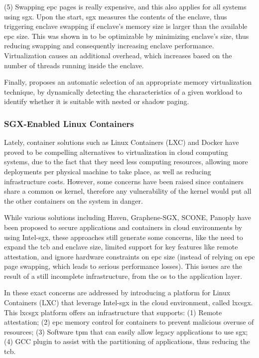 (5) Swapping \gls{epc} pages is really expensive, and this also applies for all systems using \gls{sgx}. 
Upon the start, \gls{sgx} measures the contents of the enclave, thus triggering enclave swapping if enclave's memory size is larger than the available \gls{epc} size. 
This was shown in \cite{sgxVirtualizationPaper} to be optimizable by minimizing enclave's size, thus reducing swapping and consequently increasing enclave performance.
Virtualization causes an additional overhead, which increases based on the number of threads running inside the enclave.

Finally, \cite{sgxVirtualizationPaper} proposes an automatic selection of an appropriate memory virtualization technique, by dynamically detecting the characteristics of a given workload to identify whether it is suitable with nested or shadow paging.


\subsubsection{SGX-Enabled Linux Containers}
Lately, container solutions such as Linux Containers (LXC) and Docker have proved to be compelling alternatives to virtualization in cloud computing systems, due to the fact that they need less computing resources, allowing more deployments per physical machine to take place, as well as reducing infrastructure costs. However, some concerns have been raised since containers share a common \gls{os} kernel, therefore any vulnerability of the kernel would put all the other containers on the system in danger.

While various solutions including Haven, Graphene-SGX, SCONE, Panoply have been proposed to secure applications and containers in cloud environments by using Intel-\gls{sgx}, these approaches still generate some concerns, like the need to expand the \gls{tcb} and enclave size, limited support for key features like remote attestation, and ignore hardware constraints on \gls{epc} size (instead of relying on \gls{epc} page swapping, which leads to serious performance losses). 
This issues are the result of a still incomplete infrastructure, from the \gls{os} to the application layer. 

In \cite{lxcsgxPaper} these exact concerns are addressed by introducing a platform for Linux Containers (LXC) that leverage Intel-\gls{sgx} in the cloud environment, called lxcsgx. 
This lxcsgx platform offers an infrastructure that supports: (1) Remote attestation; (2) \gls{epc} memory control for containers to prevent malicious overuse of resources; (3) Software \gls{tpm} that can easily allow legacy applications to use \gls{sgx}; (4) GCC plugin to assist with the partitioning of applications, thus reducing the \gls{tcb}.

